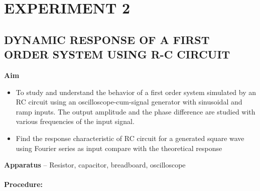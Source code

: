\documentclass[11pt]{scrreprt}
\begin{document}
\newpage

\chapter*{\Large EXPERIMENT 2}
\setcounter{chapter}{2}
\setcounter{table}{0}
\setcounter{figure}{0}
\section*{\normalsize DYNAMIC RESPONSE OF A FIRST ORDER SYSTEM USING R-C CIRCUIT}
\textbf{Aim}

\begin{itemize}
\item To study and understand the behavior of a first order system simulated by an RC circuit using an oscilloscope-cum-signal generator with sinusoidal and ramp inputs. The output amplitude and the phase difference are studied with various frequencies of the input signal.
\item Find the response characteristic of RC circuit for a generated square wave using Fourier series as input compare with the theoretical response
\end{itemize} 
\textbf{Apparatus} – Resistor, capacitor, breadboard, oscilloscope\\
\\
\textbf{Procedure:}
\end{document}
